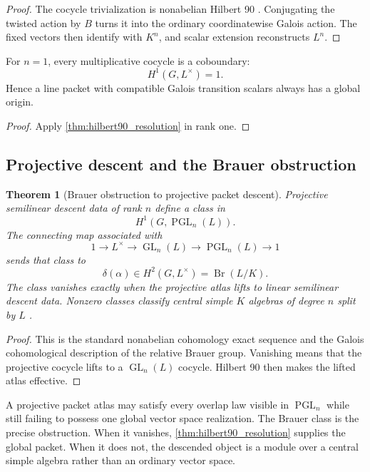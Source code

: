 \documentclass{aomart}
\newtheorem{theorem}{Theorem}[section]
\theoremstyle{definition}
\theoremstyle{remark}
\newcommand{\GL}{\operatorname{GL}}
\newcommand{\PGL}{\operatorname{PGL}}
\newcommand{\Br}{\operatorname{Br}}
\newcommand{\Rcite}[1]{\cite{#1}}
\begin{document}
\begin{proof}
The cocycle trivialization is nonabelian Hilbert 90 \Rcite{R24}. Conjugating the twisted action by \(B\) turns it into the ordinary coordinatewise Galois action. The fixed vectors then identify with \(K^n\), and scalar extension reconstructs \(L^n\).
\end{proof}

\begin{corollary}\label{cor:line_hilbert90}
For \(n=1\), every multiplicative cocycle is a coboundary:
\[
 H^1(G,L^\times)=1.
\]
Hence a line packet with compatible Galois transition scalars always has a global origin.
\end{corollary}

\begin{proof}
Apply \cref{thm:hilbert90_resolution} in rank one.
\end{proof}

\subsection{Projective descent and the Brauer obstruction}

\begin{theorem}[Brauer obstruction to projective packet descent]\label{thm:brauer_obstruction}
Projective semilinear descent data of rank \(n\) define a class in
\[
 H^1(G,\PGL_n(L)).
\]
The connecting map associated with
\[
 1\longrightarrow L^\times
 \longrightarrow\GL_n(L)
 \longrightarrow\PGL_n(L)
 \longrightarrow1
\]
sends that class to
\[
 \boxed{
 \delta(\alpha)
 \in
 H^2(G,L^\times)
 =
 \Br(L/K).
 }
\]
The class vanishes exactly when the projective atlas lifts to linear semilinear descent data. Nonzero classes classify central simple \(K\) algebras of degree \(n\) split by \(L\) \Rcite{R24,R27}.
\end{theorem}

\begin{proof}
This is the standard nonabelian cohomology exact sequence and the Galois cohomological description of the relative Brauer group. Vanishing means that the projective cocycle lifts to a \(\GL_n(L)\) cocycle. Hilbert 90 then makes the lifted atlas effective.
\end{proof}

\begin{corollary}\label{cor:brauer_resolution_interpretation}
A projective packet atlas may satisfy every overlap law visible in \(\PGL_n\) while still failing to possess one global vector space realization. The Brauer class is the precise obstruction. When it vanishes, \cref{thm:hilbert90_resolution} supplies the global packet. When it does not, the descended object is a module over a central simple algebra rather than an ordinary vector space.
\end{corollary}
\end{document}
